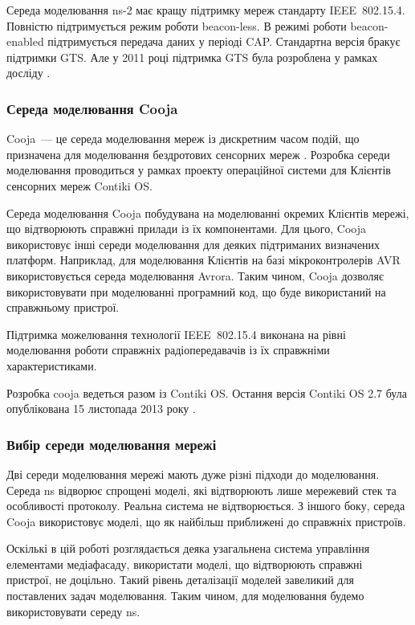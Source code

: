 \documentclass[a4paper,ukrainian,utf8,nocolumnsxix,floatsection,equationsection]{eskdtext}
\renewcommand\paragraph{\subsubsection}
\newcommand{\iee}[0]{IEEE~802.15.4\xspace}
\newcommand{\blm}[0]{beacon-less\xspace}
\newcommand{\bem}[0]{beacon-enabled\xspace}
\begin{document}
Середа моделювання ns-2 має кращу підтримку мереж стандарту \iee. Повністю підтримується режим роботи \blm. В режимі роботи \bem підтримується передача даних у періоді CAP. Стандартна версія бракує підтримки GTS. Але у 2011 році підтримка GTS була розроблена у рамках досліду \cite{ns2:with:cfp}.

\paragraph{Середа моделювання Cooja}

Cooja~--- це середа моделювання мереж із дискретним часом подій, що призначена для моделювання бездротових сенсорних мереж \cite{cooja:intro}. Розробка середи моделювання проводиться у рамках проекту операційної системи для Клієнтів сенсорних мереж Contiki OS. 

Середа моделювання Cooja побудувана на моделюванні окремих Клієнтів мережі, що відтворюють справжні прилади із їх компонентами. Для цього, Cooja використовує інші середи моделювання для деяких підтриманих  визначених платформ. Наприклад, для моделювання Клієнтів на базі мікроконтролерів AVR використовується середа моделювання Avrora. Таким чином, Cooja дозволяє використовувати при моделюванні програмний код, що буде використаний на справжньому пристрої.

Підтримка можелювання технології \iee виконана на рівні моделювання роботи справжніх радіопередавачів із їх справжніми характеристиками.

Розробка cooja ведеться разом із Contiki OS. Остання версія Contiki OS 2.7 була опублікована 15 листопада 2013 року \cite{contikios:27:released}. 

\paragraph{Вибір середи моделювання мережі}

Дві середи моделювання мережі мають дуже різні підходи до моделювання. Середа ns відворює спрощені моделі, які відтворюють лише мережевий стек та особливості протоколу. Реальна система не відтворюється. З іншого боку, середа Cooja використовує моделі, що як найбільш приближені до справжніх пристроїв. 

Оскількі в цій роботі розглядається деяка узагальнена система управління елементами медіафасаду, використати моделі, що відтворюють справжні пристрої, не доцільно. Такий рівень деталізації моделей завеликий для поставлених задач моделювання. Таким чином, для моделювання будемо використовувати середу ns.
\end{document}
